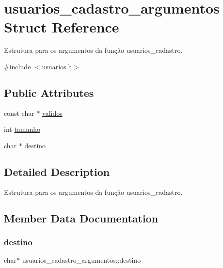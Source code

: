 \hypertarget{structusuarios__cadastro__argumentos}{}\section{usuarios\+\_\+cadastro\+\_\+argumentos Struct Reference}
\label{structusuarios__cadastro__argumentos}


Estrutura para os argumentos da função usuarios\+\_\+cadastro.  




{\ttfamily \#include $<$usuarios.\+h$>$}

\subsection*{Public Attributes}
\begin{DoxyCompactItemize}
\item 
const char $\ast$ \hyperlink{structusuarios__cadastro__argumentos_a73e28fdef34e583882bb8e558a5052bd}{validos}
\item 
int \hyperlink{structusuarios__cadastro__argumentos_a27c45f9ef8db9c9a56ebe748f683de38}{tamanho}
\item 
char $\ast$ \hyperlink{structusuarios__cadastro__argumentos_a101c0c484a4cceb0a830f561a7d425b9}{destino}
\end{DoxyCompactItemize}


\subsection{Detailed Description}
Estrutura para os argumentos da função usuarios\+\_\+cadastro. 

\subsection{Member Data Documentation}
\mbox{\label{structusuarios__cadastro__argumentos_a101c0c484a4cceb0a830f561a7d425b9}} 
\subsubsection{\texorpdfstring{destino}{destino}}
{\footnotesize\ttfamily char$\ast$ usuarios\+\_\+cadastro\+\_\+argumentos\+::destino}


